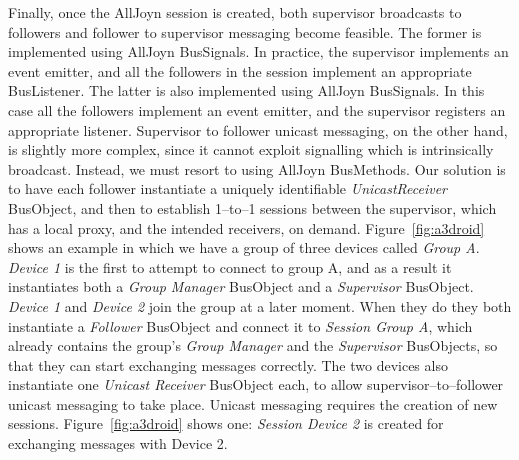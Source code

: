 Finally, once the AllJoyn session is created, both supervisor broadcasts to followers and follower to supervisor messaging become feasible. The former is implemented using AllJoyn BusSignals. In practice, the supervisor implements an event emitter, and all the followers in the session implement an appropriate BusListener. The latter is also implemented using AllJoyn BusSignals. In this case all the followers implement an event emitter, and the supervisor registers an appropriate listener. Supervisor to follower unicast messaging, on the other hand, is slightly more complex, since it cannot exploit signalling which is intrinsically broadcast. Instead, we must resort to using AllJoyn BusMethods. Our solution is to have each follower instantiate a uniquely identifiable \emph{UnicastReceiver} BusObject, and then to establish 1--to--1 sessions between the supervisor, which has a local proxy, and the intended receivers, on demand. Figure~\ref{fig:a3droid} shows an example in which we have a group of three devices called \emph{Group A}. \emph{Device 1} is the first to attempt to connect to group A, and as a result it instantiates both a \emph{Group Manager} BusObject and a \emph{Supervisor} BusObject. \emph{Device 1} and \emph{Device 2} join the group at a later moment. When they do they both instantiate a \emph{Follower} BusObject and connect it to \emph{Session Group A}, which already contains the group's \emph{Group Manager} and the \emph{Supervisor} BusObjects, so that they can start exchanging messages correctly. The two devices also instantiate one \emph{Unicast Receiver} BusObject each, to allow supervisor--to--follower unicast messaging to take place. Unicast messaging requires the creation of new sessions. Figure~\ref{fig:a3droid} shows one: \emph{Session Device 2} is created for exchanging messages with Device 2.








